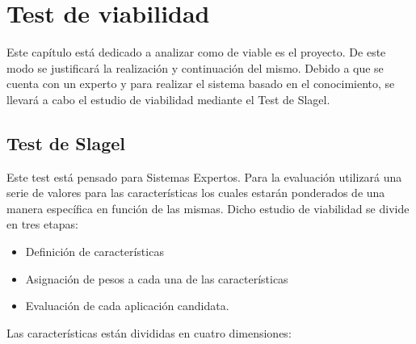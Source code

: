 \chapter{Test de viabilidad}
\label{cap: Introducción y objetivos}

Este capítulo está dedicado a analizar como de viable es el proyecto. De este modo
se justificará la realización y continuación del mismo. Debido a que se cuenta con
un experto y para realizar el sistema basado en el conocimiento, se llevará a cabo
el estudio de viabilidad mediante el Test de Slagel.

\section{Test de Slagel}


Este test está pensado para Sistemas Expertos. Para la evaluación utilizará una serie
de valores para las características los cuales estarán ponderados de una manera
específica en función de las mismas. Dicho estudio de viabilidad se divide en tres etapas:

\begin{itemize}
  \item Definición de características
  \item Asignación de pesos a cada una de las características
  \item Evaluación de cada aplicación candidata.
\end{itemize}

Las características están divididas en cuatro dimensiones:

